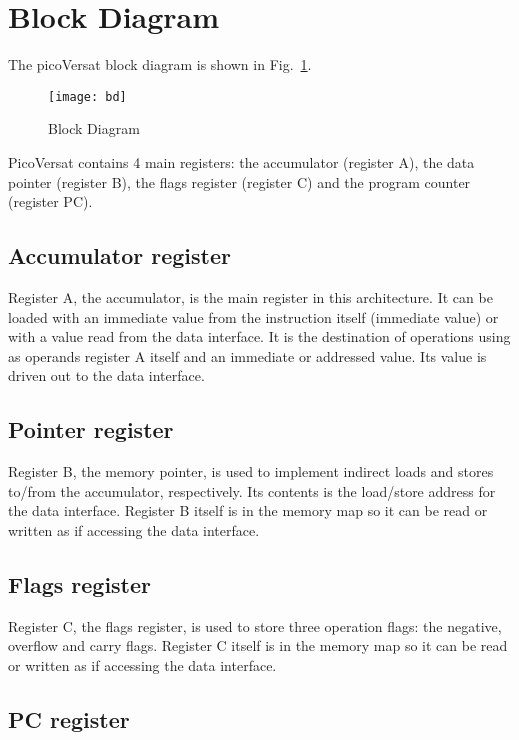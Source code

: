 \section{Block Diagram}

The picoVersat block diagram is shown in Fig.~\ref{fig:bd}.

\begin{figure}[!htbp]
    \centerline{\texttt{[image: bd]}}
    \vspace{0cm}\caption{Block Diagram}
    \label{fig:bd}
\end{figure}


PicoVersat contains 4 main registers: the accumulator (register A), the data
pointer (register B), the flags register (register C) and the program counter
(register PC).

\subsection{Accumulator register}

Register A, the accumulator, is the main register in this architecture. It can
be loaded with an immediate value from the instruction itself (immediate value)
or with a value read from the data interface. It is the destination of
operations using as operands register A itself and an immediate or addressed
value. Its value is driven out to the data interface.

\subsection{Pointer register}

Register B, the memory pointer, is used to implement indirect loads and
stores to/from the accumulator, respectively. Its contents is the
load/store address for the data interface. Register B itself is in the memory
map so it can be read or written as if accessing the data interface.

\subsection{Flags register}

Register C, the flags register, is used to store three operation flags: the
negative, overflow and carry flags. Register C itself is in the memory
map so it can be read or written as if accessing the data interface.

\subsection{PC register}

